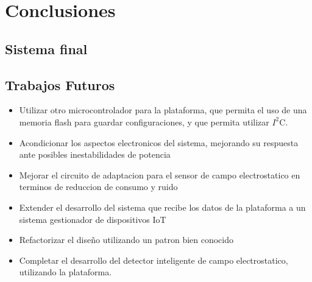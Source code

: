 \chapter{Conclusiones} %
\label{cha:conclusiones}

\section{Sistema final} %
\label{sec:sistema_final}






\section{Trabajos Futuros} %
\label{sec:trabajos_futuros}

\begin{itemize}
	\item Utilizar otro microcontrolador para la plataforma, que permita el uso de una memoria flash para guardar configuraciones, y que permita utilizar $I^{2}$C.
	\item Acondicionar los aspectos electronicos del sistema, mejorando su respuesta ante posibles inestabilidades de potencia
	\item Mejorar el circuito de adaptacion para el sensor de campo electrostatico en terminos de reduccion de consumo y ruido
	\item Extender el desarrollo del sistema que recibe los datos de la plataforma a un sistema gestionador de dispositivos IoT
	\item Refactorizar el diseño utilizando un patron bien conocido
	\item Completar el desarrollo del detector inteligente de campo electrostatico, utilizando la plataforma.
\end{itemize}



